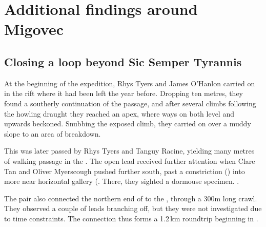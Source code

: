 \section{Additional findings around Migovec}


\subsection{Closing a loop beyond Sic Semper Tyrannis}
At the beginning of the expedition, Rhys Tyers and James O'Hanlon carried on in the  rift where it had been left the year before. Dropping ten metres, they found a southerly continuation of the passage, and after several climbs following the howling draught they reached an apex, where ways on both level and upwards beckoned. Snubbing the exposed climb, they carried on over a muddy slope to an area of breakdown. 

This was later passed by Rhys Tyers and Tanguy Racine, yielding many metres of walking passage in the . The open lead received further attention when Clare Tan and Oliver Myerscough pushed further south, past a constriction () into more near horizontal gallery (. There, they sighted a dormouse specimen. .

The pair also connected the northern end of  to the , through a 300m long crawl. They observed a couple of leads branching off, but they were not investigated due to time constraints. The connection thus forms a 1.2\,km roundtrip beginning in .

